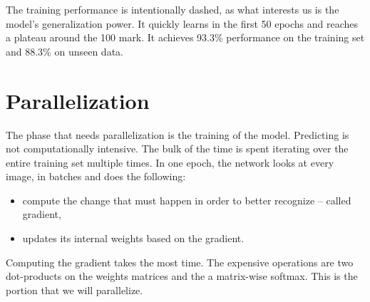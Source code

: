 \documentclass[a4paper]{article}
\begin{document}
\begin{center}
\end{center}

The training performance is intentionally dashed, as  what interests us is the model's generalization power. It quickly learns in the first 50 epochs and reaches a plateau around the 100 mark. It achieves 93.3\% performance on the training set and 88.3\% on unseen data.



\newpage
\section{Parallelization}
The phase that needs parallelization is the training of the model. Predicting is not computationally intensive. The bulk of the time is spent iterating over the entire training set multiple times. In one epoch, the network looks at every image, in batches and does the following:
\begin{itemize}
\item compute the change that must happen in order to better recognize -- called gradient,
\item updates its internal weights based on the gradient.
\end{itemize}
Computing the gradient takes the most time. The expensive operations are two dot-products on the weights matrices and the a matrix-wise softmax. This is the portion that we will parallelize.
\end{document}
